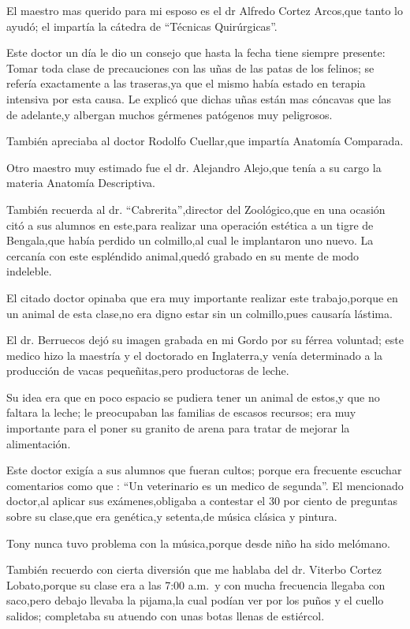 \documentclass[letterpaper,12pt]{book}
\begin{document}
El maestro mas querido para mi esposo es el dr Alfredo Cortez Arcos,que tanto lo ayudó; el impartía la cátedra de ``Técnicas Quirúrgicas''.

Este doctor un día le dio un  consejo que hasta la fecha tiene siempre presente: Tomar toda clase de precauciones con las uñas de las patas de los felinos; se refería exactamente a las traseras,ya que el mismo había estado en terapia intensiva por esta causa. Le explicó que dichas uñas están mas cóncavas que las de adelante,y albergan muchos gérmenes patógenos muy peligrosos.

También apreciaba al doctor Rodolfo Cuellar,que impartía Anatomía Comparada.

Otro maestro muy estimado fue el dr. Alejandro Alejo,que tenía a su cargo la materia Anatomía Descriptiva.

También recuerda al dr. ``Cabrerita'',director del Zoológico,que en una ocasión citó a sus alumnos en este,para realizar una operación estética a un tigre de Bengala,que había perdido un colmillo,al cual le implantaron uno nuevo. La cercanía con este espléndido animal,quedó grabado en su mente de modo
indeleble.

El  citado doctor opinaba que era muy importante realizar este trabajo,porque en un animal de esta clase,no era digno estar sin un colmillo,pues causaría lástima.

El dr. Berruecos dejó su imagen grabada en mi Gordo por su férrea voluntad; este medico hizo la maestría y el doctorado en Inglaterra,y venía determinado a la producción de vacas pequeñitas,pero productoras de leche. 

Su idea era que en poco espacio se pudiera tener un animal de estos,y que no faltara la leche; le preocupaban las familias de escasos recursos; era muy importante para el poner su granito de arena para tratar de mejorar la alimentación.

Este doctor exigía a sus alumnos que fueran cultos; porque era frecuente escuchar comentarios como que : ``Un veterinario es un medico de segunda''.
El mencionado doctor,al aplicar sus exámenes,obligaba a contestar el 30 por ciento de preguntas sobre su clase,que era genética,y setenta,de música clásica y pintura.

Tony nunca tuvo problema con la música,porque desde niño ha sido melómano. 

También recuerdo con cierta diversión que me hablaba del dr. Viterbo Cortez Lobato,porque su clase era a las 7:00 a.m.\ y con mucha frecuencia llegaba con saco,pero debajo llevaba la pijama,la cual podían  ver por los puños y el cuello salidos; completaba su atuendo con unas botas llenas de estiércol.
\end{document}

